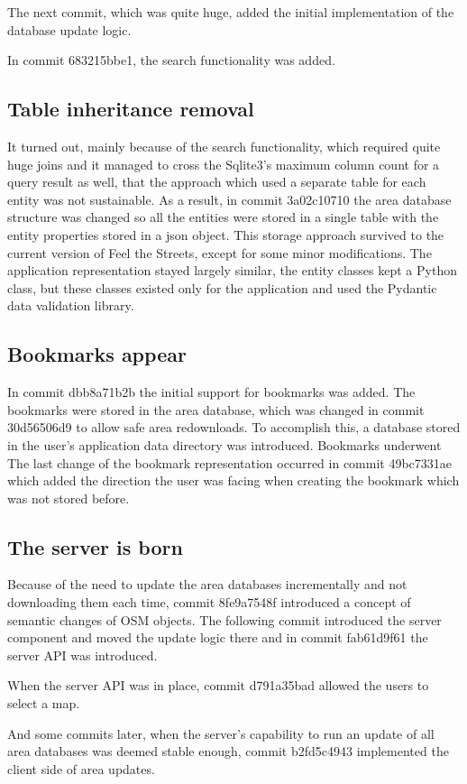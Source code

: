 \documentclass[nolof,digital]{fithesis3}
\begin{document}
The next commit, which was quite huge, added the initial implementation of the database update logic.

In commit 683215bbe1, the search functionality was added.
\subsection{Table inheritance removal}
It turned out, mainly because of the search functionality, which required quite huge joins and it managed to cross the Sqlite3's maximum column count for a query result as well, that the approach which used a separate table for each entity was not sustainable. As a result, in commit 3a02c10710 the area database structure was changed so all the entities were stored in a single table with the entity properties stored in a json object. This storage approach survived to the current version of Feel the Streets, except for some minor modifications. The application representation stayed largely similar, the entity classes kept a Python class, but these classes existed only for the application and used the Pydantic data validation library.
\subsection{Bookmarks appear}
In commit dbb8a71b2b the initial support for bookmarks was added. The bookmarks were stored in the area database, which was changed in commit 30d56506d9 to allow safe area redownloads. To accomplish this, a database stored in the user's application data directory was introduced. Bookmarks underwent The last change of the bookmark representation occurred in commit 49bc7331ae which added the direction the user was facing when creating the bookmark which was not stored before.
\subsection{The server is born}
Because of the need to update the area databases incrementally and not downloading them each time, commit 8fe9a7548f introduced a concept of semantic changes of OSM objects. The following commit introduced the server component and moved the update logic there and in commit fab61d9f61 the server API was introduced.

When the server API was in place, commit d791a35bad allowed the users to select a map. 

And some commits later, when the server's capability to run an update of all area databases was deemed stable enough, commit b2fd5c4943 implemented the client side of area updates.
\end{document}

